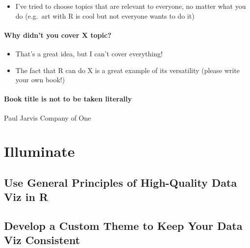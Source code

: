 \documentclass[
]{book}
\providecommand{\tightlist}{%
  \setlength{\itemsep}{0pt}\setlength{\parskip}{0pt}}
\begin{document}
\begin{itemize}
\tightlist
\item
  I've tried to choose topics that are relevant to everyone, no matter what you do (e.g.~art with R is cool but not everyone wants to do it)
\end{itemize}

\hypertarget{why-didnt-you-cover-x-topic}{%
\subsection{Why didn't you cover X topic?}\label{why-didnt-you-cover-x-topic}}

\begin{itemize}
\tightlist
\item
  That's a great idea, but I can't cover everything!
\item
  The fact that R can do X is a great example of its versatility (please write your own book!)
\end{itemize}

\hypertarget{book-title-is-not-to-be-taken-literally}{%
\subsection{Book title is not to be taken literally}\label{book-title-is-not-to-be-taken-literally}}

Paul Jarvis Company of One

\hypertarget{part-illuminate}{%
\part*{Illuminate}\label{part-illuminate}}

\hypertarget{use-general-principles-of-high-quality-data-viz-in-r}{%
\chapter*{Use General Principles of High-Quality Data Viz in R}\label{use-general-principles-of-high-quality-data-viz-in-r}}

\hypertarget{develop-a-custom-theme-to-keep-your-data-viz-consistent}{%
\chapter*{Develop a Custom Theme to Keep Your Data Viz Consistent}\label{develop-a-custom-theme-to-keep-your-data-viz-consistent}}
\end{document}
